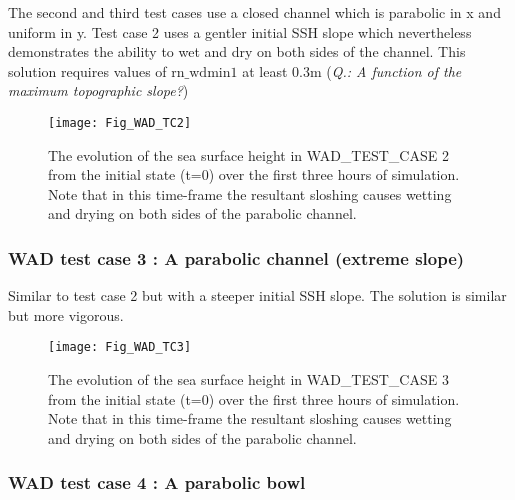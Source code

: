 The second and third test cases use a closed channel which is parabolic in x and uniform
in y.  Test case 2 uses a gentler initial SSH slope which nevertheless demonstrates the
ability to wet and dry on both sides of the channel. This solution requires values of
$\mathrm{rn\_wdmin1}$ at least 0.3m ({\it Q.: A function of the maximum topographic
slope?})


\begin{figure}[htb] \begin{center}
\texttt{[image: Fig\_WAD\_TC2]}
\caption{ \label{Fig_WAD_TC2}
The evolution of the sea surface height in WAD\_TEST\_CASE 2 from the initial state (t=0)
over the first three hours of simulation. Note that in this time-frame the resultant sloshing
causes wetting and drying on both sides of the parabolic channel.}
\end{center}\end{figure}

\clearpage
\subsubsection [WAD test case 3 : A parabolic channel (extreme slope) ]
                    {WAD test case 3 : A parabolic channel (extreme slope)}
\label{WAD_test_case3}

Similar to test case 2 but with a steeper initial SSH slope. The solution is similar but more vigorous.


\begin{figure}[htb] \begin{center}
\texttt{[image: Fig\_WAD\_TC3]}
\caption{ \label{Fig_WAD_TC3}
The evolution of the sea surface height in WAD\_TEST\_CASE 3 from the initial state (t=0)
over the first three hours of simulation. Note that in this time-frame the resultant sloshing
causes wetting and drying on both sides of the parabolic channel.}
\end{center}\end{figure}

\clearpage
\subsubsection [WAD test case 4 : A parabolic bowl ]
                    {WAD test case 4 : A parabolic bowl}
\label{WAD_test_case4}


